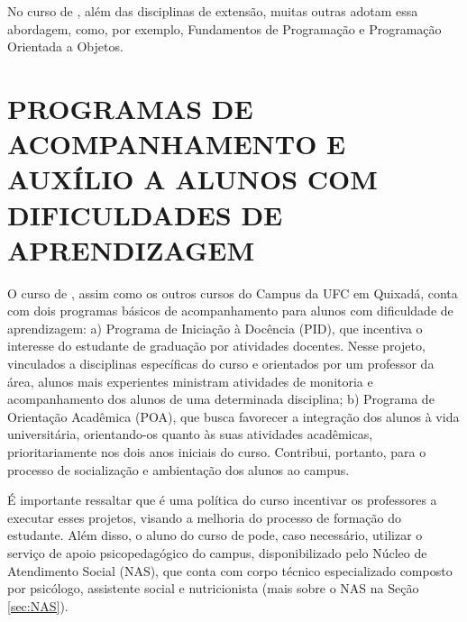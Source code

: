No curso de \nomedocurso, além das disciplinas de extensão, muitas outras adotam essa abordagem, como, por exemplo, Fundamentos de Programação e Programação Orientada a Objetos.

\section{PROGRAMAS DE ACOMPANHAMENTO E AUXÍLIO A ALUNOS COM DIFICULDADES DE APRENDIZAGEM}

O curso de \nomedocurso, assim como os outros cursos do Campus da UFC em Quixadá, conta com dois programas básicos de acompanhamento para alunos com dificuldade de aprendizagem: a) Programa de Iniciação à Docência (PID), que incentiva o interesse do estudante de graduação por atividades docentes. Nesse projeto, vinculados a disciplinas específicas do curso e orientados por um professor da área, alunos mais experientes ministram atividades de monitoria e acompanhamento dos alunos de uma determinada disciplina; b) Programa de Orientação Acadêmica (POA), que busca favorecer a integração dos alunos à vida universitária, orientando-os quanto às suas atividades acadêmicas, prioritariamente nos dois anos iniciais do curso. Contribui, portanto, para o processo de socialização e ambientação dos alunos ao campus.


É importante ressaltar que é uma política do curso incentivar os professores a executar esses projetos, visando a melhoria do processo de formação do estudante. Além disso, o aluno do curso de \nomedocurso pode, caso necessário, utilizar o serviço de apoio psicopedagógico do campus, disponibilizado pelo Núcleo de Atendimento Social (NAS), que conta com corpo técnico especializado composto por psicólogo, assistente social e nutricionista (mais sobre o NAS na Seção \ref{sec:NAS}).

